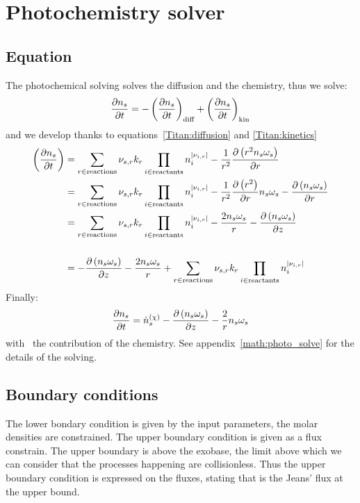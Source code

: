 \section{Photochemistry solver}

\subsection{Equation}

The photochemical solving solves the diffusion and the chemistry, thus we solve:
\begin{equation}
\frac{\partial n_s}{\partial t} = - \left(\frac{\partial n_s}{\partial t}\right)_\text{diff} + \left(\frac{\partial n_s}{\partial t}\right)_\text{kin}
\end{equation}
and we develop thanks to equations~\ref{Titan:diffusion} and \ref{Titan:kinetics}
\begin{equation}
\begin{split}
\left(\frac{\partial n_s}{\partial t}\right) & = \sum_{r\in \text{reactions}} {\nu_{s,r}}k_{r} \prod_{i\in\text{reactants}}n_i^{|{\nu_{i,r}}|} -
                                     \frac{1}{r^2}\frac{\partial\left(r^2n_s\omega_s\right)}{\partial r} \\
                                 & = \sum_{r\in \text{reactions}} {\nu_{s,r}} k_r\prod_{i\in\text{reactants}}n_i^{|{\nu_{i,r}}|} -
                                     \frac{1}{r^2}\frac{\partial\left(r^2\right)}{\partial r}n_s\omega_s - \frac{\partial\left(n_s\omega_s\right)}{\partial r} \\
                                 & = \sum_{r\in \text{reactions}} {\nu_{s,r}} k_{r}\prod_{i\in\text{reactants}}n_i^{|{\nu_{i,r}}|} -
                                     \frac{2n_s\omega_s}{r} - \frac{\partial\left(n_s\omega_s\right)}{\partial z} \\[\baselineskip]
                                 & = - \frac{\partial\left(n_s\omega_s\right)}{\partial z} - \frac{2n_s\omega_s}{r} + \sum_{r\in \text{reactions}} {\nu_{s,r}} k_{r}\prod_{i\in\text{reactants}}n_i^{|{\nu_{i,r}}|} 
\end{split}
\end{equation}
Finally:
\begin{equation}
\frac{\partial n_s}{\partial t} = \dot{n}^{(\chi)}_s - \frac{\partial\left(n_s\omega_s\right)}{\partial z} - \frac{2}{r}n_s\omega_s
\label{Titan:photochem_eq}
\end{equation}
with \omegadot\ the contribution of the chemistry.
See appendix~\ref{math:photo_solve} for the details of the solving.

\subsection{Boundary conditions}

The lower bondary condition is given by the input parameters, the molar densities
are constrained. The upper boundary condition is given as a flux constrain. The
upper boundary is above the exobase, the limit above which we can consider that
the processes happening are collisionless. Thus the upper boundary condition
is expressed on the fluxes, stating that \doverdz{\conc} is the Jeans' flux
at the upper bound.
